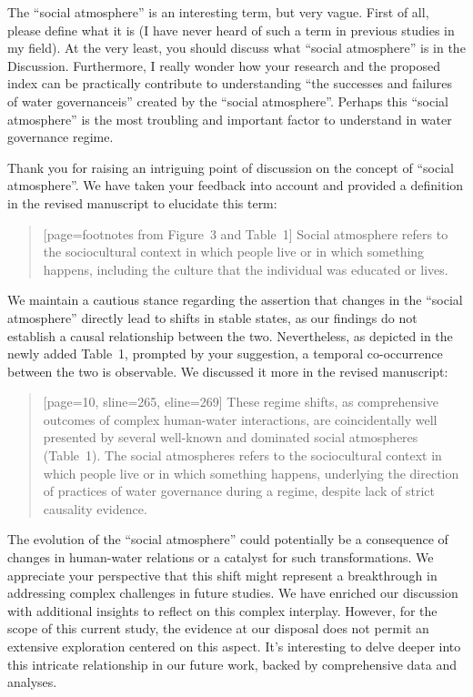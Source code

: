 \RC{} The ``social atmosphere'' is an interesting term, but very vague. First of all, please define what it is (I have never heard of such a term in previous studies in my field). At the very least, you should discuss what ``social atmosphere'' is in the Discussion. Furthermore, I really wonder how your research and the proposed index can be practically contribute to understanding ``the successes and failures of water governanceis'' created by the ``social atmosphere''. Perhaps this ``social atmosphere'' is the most troubling and important factor to understand in water governance regime.

\AR{} Thank you for raising an intriguing point of discussion on the concept of ``social atmosphere''. We have taken your feedback into account and provided a definition in the revised manuscript to elucidate this term:

\begin{quote}[page=footnotes from Figure~3 and Table~1]
    Social atmosphere refers to the sociocultural context in which people live or in which something happens, including the culture that the individual was educated or lives.
\end{quote}

\AR*{} We maintain a cautious stance regarding the assertion that changes in the ``social atmosphere'' directly lead to shifts in stable states, as our findings do not establish a causal relationship between the two. Nevertheless, as depicted in the newly added Table~1, prompted by your suggestion, a temporal co-occurrence between the two is observable. We discussed it more in the revised manuscript:

\begin{quote}[page=10, sline=265, eline=269]
    These regime shifts, as comprehensive outcomes of complex human-water interactions, are coincidentally well presented by several well-known and dominated social atmospheres (Table~1).
    The social atmospheres refers to the sociocultural context in which people live or in which something happens, underlying the direction of practices of water governance during a regime, despite lack of strict causality evidence.
\end{quote}

\AR*{} The evolution of the ``social atmosphere'' could potentially be a consequence of changes in human-water relations or a catalyst for such transformations. We appreciate your perspective that this shift might represent a breakthrough in addressing complex challenges in future studies. We have enriched our discussion with additional insights to reflect on this complex interplay. However, for the scope of this current study, the evidence at our disposal does not permit an extensive exploration centered on this aspect. It's interesting to delve deeper into this intricate relationship in our future work, backed by comprehensive data and analyses.


